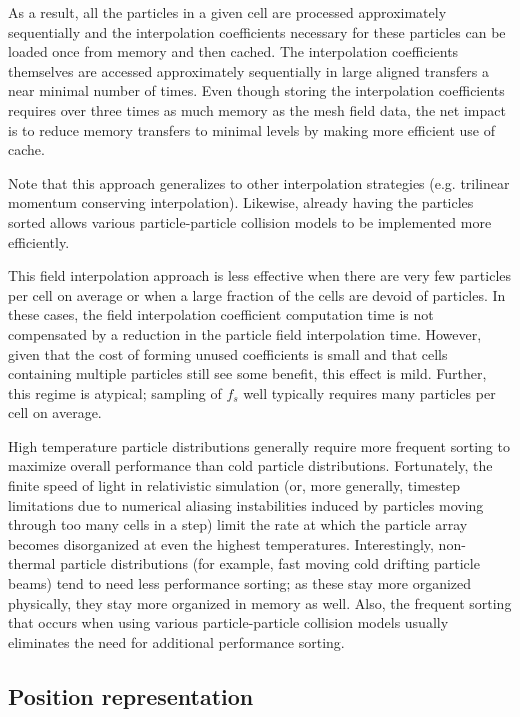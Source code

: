 \documentclass[letter,10pt]{article}
\begin{document}
As a result, all the particles in a given cell are processed
approximately sequentially and the interpolation coefficients
necessary for these particles can be loaded once from memory and then
cached.  The interpolation coefficients themselves are accessed
approximately sequentially in large aligned transfers a near minimal
number of times.  Even though storing the interpolation coefficients
requires over three times as much memory as the mesh field data, the
net impact is to reduce memory transfers to minimal levels by making
more efficient use of cache.

Note that this approach generalizes to other interpolation strategies
(e.g. trilinear momentum conserving interpolation).  Likewise, already
having the particles sorted allows various particle-particle
collision models to be implemented more efficiently.  

This field interpolation approach is less effective when there are
very few particles per cell on average or when a large fraction of the
cells are devoid of particles.  In these cases, the field
interpolation coefficient computation time is not compensated by a
reduction in the particle field interpolation time.  However, given
that the cost of forming unused coefficients is small and that cells
containing multiple particles still see some benefit, this effect is
mild.  Further, this regime is atypical; sampling of $f_s$ well
typically requires many particles per cell on average.

High temperature particle distributions generally require more
frequent sorting to maximize overall performance than cold particle
distributions.  Fortunately, the finite speed of light in relativistic
simulation (or, more generally, timestep limitations due to numerical
aliasing instabilities induced by particles moving through too many
cells in a step) limit the rate at which the particle array becomes
disorganized at even the highest temperatures.  Interestingly,
non-thermal particle distributions (for example, fast moving cold
drifting particle beams) tend to need less performance sorting; as
these stay more organized physically, they stay more organized in
memory as well.  Also, the frequent sorting that occurs when using
various particle-particle collision models usually eliminates the need
for additional performance sorting.

\subsection{Position representation}
\end{document}
